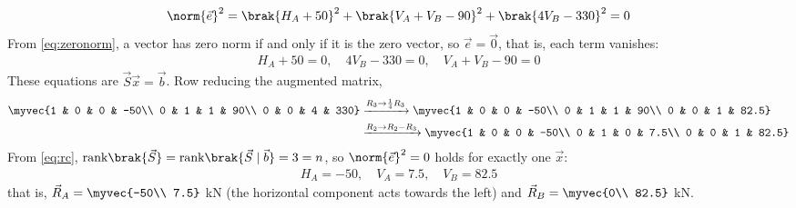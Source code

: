 \begin{enumerate}[label=\thesubsection.\arabic*, ref=\thesubsection.\theenumi, itemsep=0pt, leftmargin=*]
\begin{align}
\norm{\vec{e}}^2 = \brak{H_A + 50}^2 + \brak{V_A + V_B - 90}^2 + \brak{4V_B - 330}^2 = 0
\end{align}
From \eqref{eq:zeronorm}, a vector has zero norm if and only if it is the zero vector, so $\vec{e} = \vec{0}$, that is, each term vanishes:
\begin{align}
H_A + 50 = 0,\quad 4V_B - 330 = 0,\quad V_A + V_B - 90 = 0
\end{align}
These equations are $\vec{S}\vec{x} = \vec{b}$. Row reducing the augmented matrix,
\begin{align}
\myvec{1 & 0 & 0 & -50\\ 0 & 1 & 1 & 90\\ 0 & 0 & 4 & 330}
&\xrightarrow{R_3\to\frac{1}{4}R_3}
\myvec{1 & 0 & 0 & -50\\ 0 & 1 & 1 & 90\\ 0 & 0 & 1 & 82.5}\\
&\xrightarrow{R_2\to R_2 - R_3}
\myvec{1 & 0 & 0 & -50\\ 0 & 1 & 0 & 7.5\\ 0 & 0 & 1 & 82.5}
\end{align}
From \eqref{eq:rc}, $\text{rank}\brak{\vec{S}} = \text{rank}\brak{\vec{S}\mid\vec{b}} = 3 = n$, so $\norm{\vec{e}}^2 = 0$ holds for exactly one $\vec{x}$:
\begin{align}
H_A = -50,\quad V_A = 7.5,\quad V_B = 82.5
\end{align}
that is, $\vec{R}_A = \myvec{-50\\ 7.5}$ kN (the horizontal component acts towards the left) and $\vec{R}_B = \myvec{0\\ 82.5}$ kN.


\end{enumerate}
